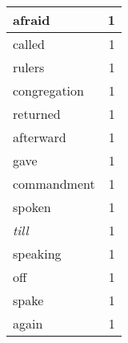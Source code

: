 \begin{center}
\begin{longtable}{l|r}
afraid & 1 \\ \hline
called & 1 \\ \hline
rulers & 1 \\ \hline
congregation & 1 \\ \hline
returned & 1 \\ \hline
afterward & 1 \\ \hline
gave & 1 \\ \hline
commandment & 1 \\ \hline
spoken & 1 \\ \hline
\emph{till} & 1 \\ \hline
speaking & 1 \\ \hline
off & 1 \\ \hline
spake & 1 \\ \hline
again & 1 \\ \hline
\end{longtable}
\end{center}



\normalsize



